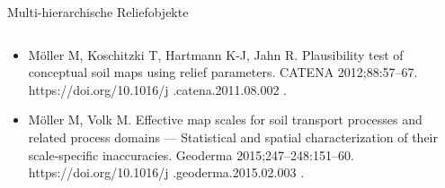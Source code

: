 \begin{frame}{Multi-hierarchische Reliefobjekte}
\begin{columns}
\begin{block}{}
 \end{block}
  \end{columns}
\raggedright\tiny 
\vspace{4,9pt}
 \begin{itemize}
     \item Möller M, Koschitzki T, Hartmann K-J, Jahn R. Plausibility test of conceptual soil maps using relief parameters. CATENA 2012;88:57–67. https://doi.org/10.1016/j  .catena.2011.08.002 .
     \item  Möller M, Volk M. Effective map scales for soil transport processes and related process domains — Statistical and spatial characterization of their scale-specific inaccuracies. Geoderma 2015;247–248:151–60. https://doi.org/10.1016/j  .geoderma.2015.02.003 .
 \end{itemize}
\end{frame}


